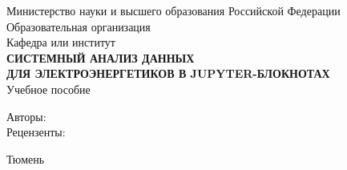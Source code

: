 \begin{titlepage}
\begin{center}
\large
Министерство науки и высшего образования Российской Федерации\\
Образовательная организация\\
Кафедра или институт\\[3cm]

\textbf{\Large СИСТЕМНЫЙ АНАЛИЗ ДАННЫХ\\
ДЛЯ ЭЛЕКТРОЭНЕРГЕТИКОВ В JUPYTER-БЛОКНОТАХ}\\[1cm]

Учебное пособие\\[4cm]

\begin{flushright}
Авторы: \underline{\hspace{5cm}}\\
Рецензенты: \underline{\hspace{5cm}}
\end{flushright}

\vfill
Тюмень\\
\the\year
\end{center}
\end{titlepage}
